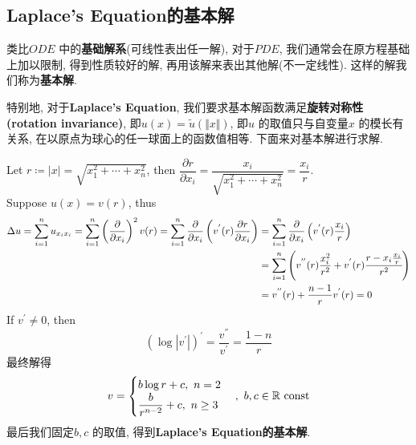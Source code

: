 \newpage
\subsection{Laplace's Equation的基本解}
	类比$ODE$ 中的\textbf{基础解系}(可线性表出任一解), 对于$PDE$, 我们通常会在原方程基础上加以限制, 得到性质较好的解, 再用该解来表出其他解(不一定线性). 这样的解我们称为\textbf{基本解}. 
	
	\vspace{1em}
	
	特别地, 对于\textbf{Laplace's Equation}, 我们要求基本解函数满足\textbf{旋转对称性 (rotation invariance)}, 即$u(x) = \widetilde{u} (\Vert x \Vert)$, 即$u$ 的取值只与自变量$x$ 的模长有关系, 在以原点为球心的任一球面上的函数值相等. 下面来对基本解进行求解. 
	
	\vspace{4em}
	
	Let $r \coloneqq \left| x \right| = \sqrt{x_{1}^2 + \cdots + x_{n}^2}$, then $\dfrac{\partial r}{\partial x_i} = \dfrac{x_i}{\sqrt{x_{1}^2 + \cdots + x_{n}^2}} = \dfrac{x_i}{r}$. \\
	Suppose $u(x) = v(r)$, thus
	\begin{align}
		\Delta u 
		= \sum_{i = 1}^{n} u_{x_i x_i} 
		= \sum_{i = 1}^{n} \left( \frac{\partial}{\partial x_i} \right)^2 v(r) 
		= \sum_{i = 1}^{n} \frac{\partial}{\partial x_i} \left( v^{'}(r) \frac{\partial r}{\partial x_i} \right) 
		&= \sum_{i = 1}^{n} \frac{\partial}{\partial x_i} \left( v^{'}(r) \frac{x_i}{r} \right) \\
		&= \sum_{i = 1}^{n} \left( v^{''}(r) \frac{x_{i}^2}{r^2} + v^{'}(r) \cfrac{r - x_i \frac{x_i}{r}}{r^2} \right) \\
		&= v^{''}(r) + \frac{n - 1}{r} v^{'}(r) = 0
	\end{align}
	If $v^{'} \neq 0$, then 
	\[ \left( \log \left| v^{'} \right| \right)^{'} = \frac{v^{''}}{v^{'}} = \frac{1 - n}{r} \]
	最终解得
	\begin{align}
		v = 
		\begin{cases}
			b \log r + c , \,\, n = 2 \\
			\dfrac{b}{r^{n - 2}} + c , \,\, n \geq 3
		\end{cases} , \,\, b , c \in \mathbb{R} \,\, \text{const}
	\end{align}
	最后我们固定$b , c$ 的取值, 得到\textbf{Laplace's Equation的基本解}. 
	
